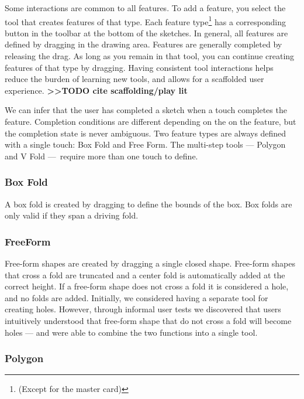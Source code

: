 Some interactions are common to all features. To add a feature, you
select the tool that creates features of that type. Each feature
type\footnote{(Except for the master card)} has a corresponding button
in the toolbar at the bottom of the sketches. In general, all features
are defined by dragging in the drawing area. Features are generally
completed by releasing the drag. As long as you remain in that tool, you
can continue creating features of that type by dragging. Having
consistent tool interactions helps reduce the burden of learning new
tools, and allows for a scaffolded user experience.
\textbf{\textgreater{}\textgreater{}TODO cite scaffolding/play lit}

We can infer that the user has completed a sketch when a touch completes
the feature. Completion conditions are different depending on the on the
feature, but the completion state is never ambiguous. Two feature types
are always defined with a single touch: Box Fold and Free Form. The
multi-step tools --- Polygon and V Fold ---~require more than one touch
to define.

\subsubsection{Box Fold}\label{box-fold}

A box fold is created by dragging to define the bounds of the box. Box
folds are only valid if they span a driving fold.

\subsubsection{FreeForm}\label{freeform}

Free-form shapes are created by dragging a single closed shape.
Free-form shapes that cross a fold are truncated and a center fold is
automatically added at the correct height. If a free-form shape does not
cross a fold it is considered a hole, and no folds are added. Initially,
we considered having a separate tool for creating holes. However,
through informal user tests we discovered that users intuitively
understood that free-form shape that do not cross a fold will become
holes --- and were able to combine the two functions into a single tool.

\subsubsection{Polygon}\label{polygon}

